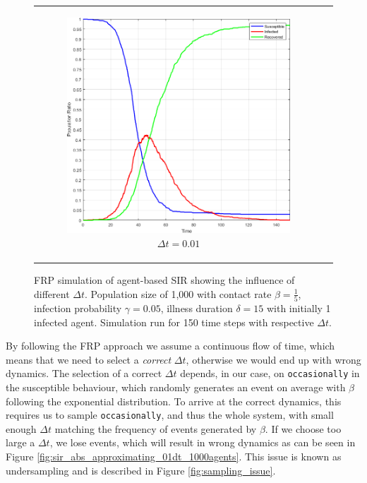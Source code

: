 \begin{figure}
\begin{center}
\begin{tabular}{c c}
		\begin{subfigure}[b]{0.4\textwidth}
			\centering
			\includegraphics[width=1\textwidth, angle=0]{./fig/timedriven/SIR_Yampa/SIR_Yampa_dt001.png}
			\caption{$\Delta t = 0.01$}
			\label{fig:sir_abs_approximating_001dt_1000agents}
		\end{subfigure}
	\end{tabular}
	
	\caption[FRP simulation of agent-based SIR showing the influence of different $\Delta t$]{FRP simulation of agent-based SIR showing the influence of different $\Delta t$. Population size of 1,000 with contact rate $\beta = \frac{1}{5}$, infection probability $\gamma = 0.05$, illness duration $\delta = 15$ with initially 1 infected agent. Simulation run for 150 time steps with respective $\Delta t$.} 
	\label{fig:sir_abs_dynamics_frp}
\end{center}
\end{figure}

By following the FRP approach we assume a continuous flow of time, which means that we need to select a \textit{correct} $\Delta t$, otherwise we would end up with wrong dynamics. The selection of a correct $\Delta t$ depends, in our case, on \texttt{occasionally} in the susceptible behaviour, which randomly generates an event on average with $\beta$ following the exponential distribution. To arrive at the correct dynamics, this requires us to sample \texttt{occasionally}, and thus the whole system, with small enough $\Delta t$ matching the frequency of events generated by $\beta$. If we choose too large a $\Delta t$, we lose events, which will result in wrong dynamics as can be seen in Figure \ref{fig:sir_abs_approximating_01dt_1000agents}. This issue is known as undersampling and is described in Figure \ref{fig:sampling_issue}.

